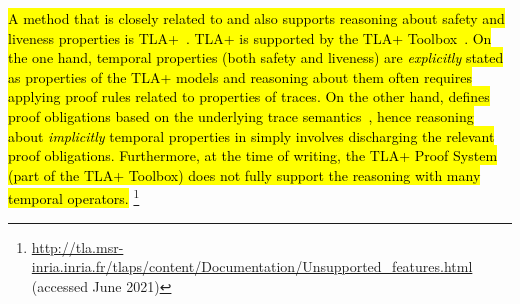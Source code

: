 \hl{%
  A method that is closely related to \mbox{\EventB} and also supports
  reasoning about safety and liveness properties is
  TLA+~\mbox{\cite{DBLP:books/aw/Lamport2002}}. TLA+ is supported by
  the TLA+ Toolbox~\mbox{\cite{DBLP:journals/corr/abs-1912-10633}}.
  On the one hand, temporal properties (both safety and liveness) are
  \emph{explicitly} stated as properties of the TLA+ models and
  reasoning about them often requires applying proof rules related to
  properties of traces. On the other hand, \mbox{\EventB} defines
  proof obligations based on the underlying trace
  semantics~\mbox{\cite{abrial10:_model_event_b,hoang2016ltl,hudon16:_unit_b_method}},
  hence reasoning about \emph{implicitly} temporal properties in
  \mbox{\EventB} simply involves discharging the relevant proof
  obligations. Furthermore, at the time of writing, the TLA+ Proof
  System (part of the TLA+ Toolbox) does not fully support the
  reasoning with many temporal operators.%
}%
\footnote{\url{http://tla.msr-inria.inria.fr/tlaps/content/Documentation/Unsupported_features.html}
  (accessed June 2021)}







